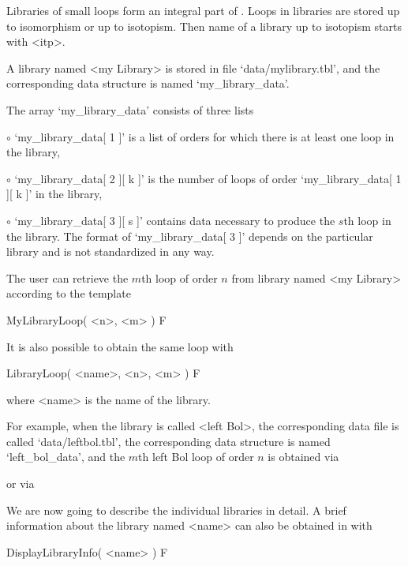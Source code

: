 
\label{lib} Libraries of small loops form an integral part of {\LOOPS}. Loops
in libraries are stored up to isomorphism or up to isotopism. Then name of a
library up to isotopism starts with <itp>.


A library named <my Library> is stored in file `data/mylibrary.tbl', and the
corresponding data structure is named `my_library_data'.

The array `my_library_data' consists of three lists
\beginlist%
\item{$\circ$}
    `my_library_data[ 1 ]' is a list of orders for which there is at
    least one loop in the library,
\item{$\circ$}
    `my_library_data[ 2 ][ k ]' is the number of loops of order
    `my_library_data[ 1 ][ k ]' in the library,
\item{$\circ$}
    `my_library_data[ 3 ][ s ]' contains data necessary to produce the
    $s$th loop in the library.
\endlist
The format of `my_library_data[ 3 ]' depends on the particular library and is
not standardized in any way.

The user can retrieve the $m$th loop of order $n$ from library named <my
Library> according to the template

\>MyLibraryLoop( <n>, <m> ) F

It is also possible to obtain the same loop with

\>LibraryLoop( <name>, <n>, <m> ) F

where <name> is the name of the library.

For example, when the library is called <left Bol>, the corresponding data file
is called `data/leftbol.tbl', the corresponding data structure is named
`left_bol_data', and the $m$th left Bol loop of order $n$ is obtained via


or via


We are now going to describe the individual libraries in detail. A brief
information about the library named <name> can also be obtained in {\LOOPS}
with

\>DisplayLibraryInfo( <name> ) F


